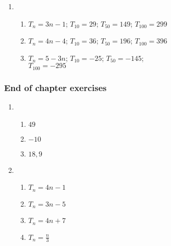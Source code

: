 {\begin{multicols}{3}
\begin{enumerate}[noitemsep, label=\textbf{\arabic*}. ]
\item %
  \begin{enumerate}[noitemsep, label=\textbf{(\alph*)} ]
  \item $T_n=3n-1$; $T_{10}=29$; $T_{50}=149$; $T_{100}=299$%
  \item $T_n=4n-4$; $T_{10}=36$; $T_{50}=196$; $T_{100}=396$%
  \item $T_n=5-3n$; $T_{10}=-25$; $T_{50}=-145$;\\ $T_{100}=-295$%
  \end{enumerate}
\end{enumerate}

\subsubsection*{End of chapter exercises} %


\begin{enumerate}[noitemsep, label=\textbf{\arabic*}. ] 
\item %
    \begin{enumerate}[noitemsep, label=\textbf{(\alph*)} ]
  \item $49$%
    \item $-10$%
    \item $18,9$%
    \end{enumerate}


\item %
    \begin{enumerate}[noitemsep, label=\textbf{(\alph*)} ]
    \item $T_n=4n-1$%
    \item $T_n=3n-5$%
    \item $T_n=4n+7$%
    \item $T_n=\frac{n}{3}$%
    \end{enumerate}


\end{enumerate}
\end{multicols}}
